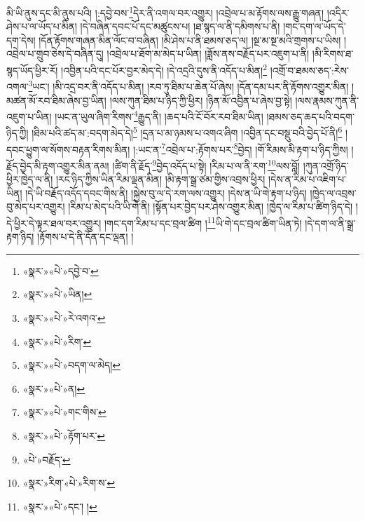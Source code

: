 མི་ཡི་ནུས་དང་མི་ནུས་པའི། །:དབྱེ་བས་\footnote{«སྣར་»«པེ་»དབྱེ་བ་}དེར་ནི་འགལ་བར་འགྱུར། །འབྲེལ་པ་མ་རྟོགས་ལས་རྒྱུ་གཞན། །འདིར་ཤེས་པ་ལ་ཡོད་པ་མིན། །དེ་བཞིན་དབང་པོ་དང་མཚུངས་པ། །ཐ་སྙད་ལ་ནི་དམིགས་པ་ནི། །གང་དག་ལ་ཡོད་དེ་དག་དེས། །དོན་རྟོགས་གཞན་མིན་ལོང་བ་བཞིན། །མི་ཤེས་པ་ནི་ཐམས་ཅད་ལ། །སྔ་མ་སྔ་མའི་གྲགས་པ་ཡིས། །འབྲེལ་པ་གྲུབ་ཅེས་དེ་བཞིན་དུ། །འབྲེལ་པ་ཐོག་མ་མེད་པ་ཡིན། །ཟློས་ནས་བརྗོད་པར་འཇུག་པ་ནི། །མི་རིགས་ཐ་སྙད་ཡོད་ཕྱིར་རོ། །འབྱིན་པའི་དང་པོར་བྱར་མེད་དེ། །དེ་འདྲའི་དུས་ནི་འདོད་པ་མིན།\footnote{«སྣར་»«པེ་»ཡིན།} །འགྲོ་བ་ཐམས་ཅད་:རེས་འགལ་\footnote{«སྣར་»«པེ་»རེ་འགའ་}ཡང་། །མི་འདྲ་བར་ནི་འདོད་པ་མིན། །རབ་ཏུ་ཐིམ་པ་ཆེན་པོ་ཞེས། །དོན་དམ་པར་ནི་རྟོགས་འགྱུར་མིན། །མཚན་མོ་རབ་ཐིམ་ཞེས་བྱ་ཡིན། །ལས་ཀུན་ཐིམ་པ་ཉིད་ཀྱི་ཕྱིར། །ཉིན་མོ་འབྱིན་པ་ཞེས་བྱ་སྟེ། །ལས་རྣམས་ཀུན་ནི་འཇུག་པ་ཡིན། །ཡང་ན་ཡུལ་ཞིག་རིགས་\footnote{«སྣར་»«པེ་»རིག་}རྒྱུད་ནི། །ཆད་པའི་ངོ་བོར་རབ་ཐིམ་ཡིན། །ཐམས་ཅད་ཆད་པའི་བདག་ཉིད་ཀྱི། །ཐིམ་པའི་ཚད་མ་:བདག་མེད་དེ།\footnote{«སྣར་»«པེ་»བདག་ལ་མེད།} །དྲན་པ་མ་ཉམས་པ་འགའ་ཞིག །འབྱིན་དང་བསྡུ་བའི་བྱེད་པོ་ནི།\footnote{«སྣར་»«པེ་»ན།} །དབང་ཕྱུག་ལ་སོགས་བརྟན་རིགས་མིན། །:ཡང་ན་\footnote{«སྣར་»«པེ་»གང་གིས་}འབྲེལ་པ་:རྟོགས་པར་\footnote{«སྣར་»«པེ་»རྟོག་པར་}བྱེད། །གོ་རིམས་མི་རྟག་པ་ཉིད་ཀྱིས། །རྗོད་བྱེད་མི་རྟག་འགྱུར་མིན་ནམ། །ཚིག་ནི་རྗོད་\footnote{«པེ་»བརྗོད་}བྱེད་འདོད་པ་སྟེ། །རིམ་པ་ལ་ནི་རག་\footnote{«སྣར་»རིག་«པེ་»རིག་ས་}ལས་བློ། །ཀུན་འགྲོ་ཉིད་ཕྱིར་ཁྱེད་ལ་ནི། །རང་ཉིད་ཀྱིས་ཡིན་རིམ་ལྡན་མིན། །མི་རྟག་སྒྲ་ཙམ་གྱིས་འབྲས་ཕྱིར། །དེས་ན་རིམ་པ་འཇིག་པ་ཡིན། །དེ་ཡི་བརྗོད་འདོད་དབང་གིས་ནི། །སྐྱེས་བུ་ལ་དེ་རག་ལས་འགྱུར། །དེས་ན་ཡི་གེ་རྟག་པ་ཉིད། །ཁྱེད་ལ་འབྲས་བུ་མེད་པར་འགྱུར། །རིམ་པ་མེད་པའི་ཡི་གེ་ནི། །སྟོན་པར་བྱེད་པར་ཤེས་འགྱུར་མིན། །ཁྱེད་ལ་རིམ་པ་ཚིག་ཉིད་དེ། །དེ་ཕྱིར་དེ་ལྟར་ཐལ་བར་འགྱུར། །གང་དག་རིམ་པ་དང་བྲལ་ཚིག །\footnote{«སྣར་»«པེ་»དང་། །}ཡི་གེ་དང་བྲལ་ཚིག་ཡིན་ཏེ། །དེ་དག་ལ་ནི་སྒྲ་རྟག་ཉིད། །རྟོགས་པ་དེ་ནི་དོན་དང་ལྡན། །
